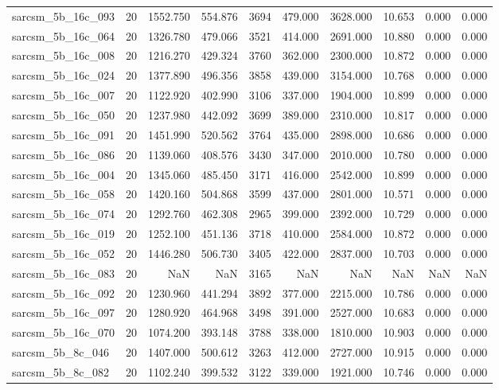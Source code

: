\begin{tabular}{lrrrrrrrrr}
sarcsm\_5b\_16c\_093 & 20 & 1552.750 & 554.876 & 3694 & 479.000 & 3628.000 & 10.653 & 0.000 & 0.000 \\
sarcsm\_5b\_16c\_064 & 20 & 1326.780 & 479.066 & 3521 & 414.000 & 2691.000 & 10.880 & 0.000 & 0.000 \\
sarcsm\_5b\_16c\_008 & 20 & 1216.270 & 429.324 & 3760 & 362.000 & 2300.000 & 10.872 & 0.000 & 0.000 \\
sarcsm\_5b\_16c\_024 & 20 & 1377.890 & 496.356 & 3858 & 439.000 & 3154.000 & 10.768 & 0.000 & 0.000 \\
sarcsm\_5b\_16c\_007 & 20 & 1122.920 & 402.990 & 3106 & 337.000 & 1904.000 & 10.899 & 0.000 & 0.000 \\
sarcsm\_5b\_16c\_050 & 20 & 1237.980 & 442.092 & 3699 & 389.000 & 2310.000 & 10.817 & 0.000 & 0.000 \\
sarcsm\_5b\_16c\_091 & 20 & 1451.990 & 520.562 & 3764 & 435.000 & 2898.000 & 10.686 & 0.000 & 0.000 \\
sarcsm\_5b\_16c\_086 & 20 & 1139.060 & 408.576 & 3430 & 347.000 & 2010.000 & 10.780 & 0.000 & 0.000 \\
sarcsm\_5b\_16c\_004 & 20 & 1345.060 & 485.450 & 3171 & 416.000 & 2542.000 & 10.899 & 0.000 & 0.000 \\
sarcsm\_5b\_16c\_058 & 20 & 1420.160 & 504.868 & 3599 & 437.000 & 2801.000 & 10.571 & 0.000 & 0.000 \\
sarcsm\_5b\_16c\_074 & 20 & 1292.760 & 462.308 & 2965 & 399.000 & 2392.000 & 10.729 & 0.000 & 0.000 \\
sarcsm\_5b\_16c\_019 & 20 & 1252.100 & 451.136 & 3718 & 410.000 & 2584.000 & 10.872 & 0.000 & 0.000 \\
sarcsm\_5b\_16c\_052 & 20 & 1446.280 & 506.730 & 3405 & 422.000 & 2837.000 & 10.703 & 0.000 & 0.000 \\
sarcsm\_5b\_16c\_083 & 20 & NaN & NaN & 3165 & NaN & NaN & NaN & NaN & NaN \\
sarcsm\_5b\_16c\_092 & 20 & 1230.960 & 441.294 & 3892 & 377.000 & 2215.000 & 10.786 & 0.000 & 0.000 \\
sarcsm\_5b\_16c\_097 & 20 & 1280.920 & 464.968 & 3498 & 391.000 & 2527.000 & 10.683 & 0.000 & 0.000 \\
sarcsm\_5b\_16c\_070 & 20 & 1074.200 & 393.148 & 3788 & 338.000 & 1810.000 & 10.903 & 0.000 & 0.000 \\
sarcsm\_5b\_8c\_046 & 20 & 1407.000 & 500.612 & 3263 & 412.000 & 2727.000 & 10.915 & 0.000 & 0.000 \\
sarcsm\_5b\_8c\_082 & 20 & 1102.240 & 399.532 & 3122 & 339.000 & 1921.000 & 10.746 & 0.000 & 0.000 \\

\end{tabular}
